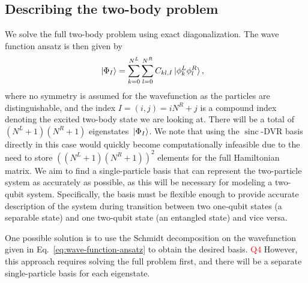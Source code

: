 \documentclass[twocolumn,superscriptaddress,unsortedaddress,
 amsmath,amssymb,
 aps,
]{revtex4-2}
\DeclareMathOperator{\sinc}{sinc}
\begin{document}
    \subsection{Describing the two-body problem}
        We solve the full two-body problem using exact diagonalization.
        The wave function ansatz is then given by
        \begin{align}
            \ket*{\Phi_I}
            &= \sum_{k = 0}^{N^L} \sum_{l = 0}^{N^R} C_{kl, I}
            \ket*{\phi^{L}_k \phi^{R}_l},
            \label{eq:wave-function-ansatz}
        \end{align}
        where no symmetry is assumed for the wavefunction as the
        particles are distinguishable, and the index
        $I = (i, j) = iN^R + j$ is a compound index denoting the
        excited two-body state we are looking at.
        There will be a total of $(N^L + 1) (N^R + 1)$ eigenstates
        $\ket*{\Phi_I}$. We note that using the $\sinc$-DVR basis directly in this case would quickly become computationally infeasible due to the need to store $((N^L + 1)(N^R + 1))^2$ elements for the full Hamiltonian matrix. 
        We aim to find a single-particle basis that can represent the two-particle system as accurately as possible, as this will be necessary for modeling a two-qubit system. 
        Specifically, the basis must be flexible enough to provide accurate description of the system during transition between two one-qubit states (a separable state) and one two-qubit state (an entangled state) and vice versa.
        

        One possible solution is to use the Schmidt decomposition on the wavefunction given in Eq.~\eqref{eq:wave-function-ansatz} to obtain the desired basis. \textcolor{red}{Q4} However, this approach requires solving the full problem first, and there will be a separate single-particle basis for each eigenstate.
\end{document}
